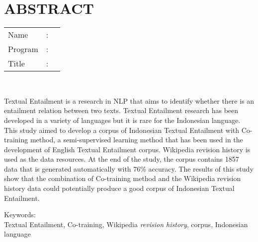 %
%
%

\chapter*{ABSTRACT}

\vspace*{0.2cm}

\noindent \begin{tabular}{l l p{11.0cm}}
	Name&: & \penulis \\
	Program&: & \programEng \\
	Title&: & \judulInggris \\
\end{tabular} \\ 

\vspace*{0.5cm}

\noindent 
Textual Entailment is a research in NLP that aims to identify whether there is an entailment relation between two texts. Textual Entailment research has been developed in a variety of languages but it is rare for the Indonesian language. This study aimed to develop a corpus of Indonesian Textual Entailment with Co-training method, a semi-supervised learning method that has been used in the development of English Textual Entailment corpus. Wikipedia revision history is used as the data resources. At the end of the study, the corpus contains 1857 data that is generated automatically with 76\% accuracy. The results of this study show that the combination of Co-training method and the Wikipedia revision history data could potentially produce a good corpus of Indonesian Textual Entailment.\\


\vspace*{0.2cm}

\noindent Keywords: \\ 
\noindent Textual Entailment, Co-training, Wikipedia \textit{revision history}, corpus, Indonesian language\\

\newpage